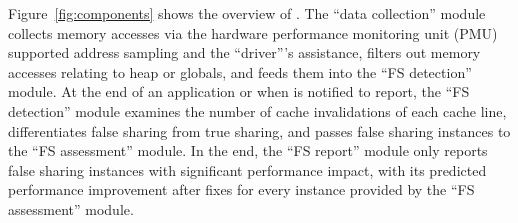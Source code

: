 %
Figure~\ref{fig:components} shows the overview of \Cheetah{}. 
The ``data collection'' module collects memory accesses via the hardware performance monitoring unit (PMU) supported address sampling and the ``driver'''s assistance, filters out memory accesses relating to heap or globals, and feeds them into the ``FS detection'' module. At the end of an application or when \cheetah{} is notified to report, the ``FS detection'' module examines the number of cache invalidations of each cache line, differentiates false sharing from true sharing, and passes false sharing instances to the ``FS assessment'' module. In the end, the ``FS report'' module only reports false sharing instances with significant performance impact, with its predicted performance improvement after fixes for every instance provided by the ``FS assessment'' module. 


